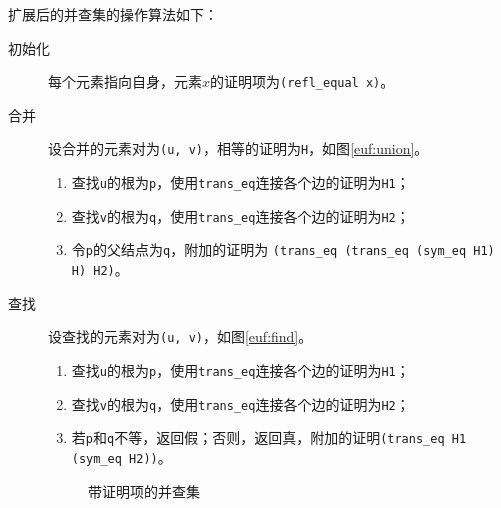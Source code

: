扩展后的并查集的操作算法如下：
\begin{description}
  \item[初始化] 每个元素指向自身，元素$x$的证明项为\texttt{(refl\_equal x)}。
  \item[合并] 设合并的元素对为\texttt{(u, v)}，相等的证明为\texttt{H}，如图\ref{euf:union}。
    \begin{enumerate}
      \item 查找\texttt{u}的根为\texttt{p}，使用\texttt{trans\_eq}连接各个边的证明为\texttt{H1}；
      \item 查找\texttt{v}的根为\texttt{q}，使用\texttt{trans\_eq}连接各个边的证明为\texttt{H2}；
      \item 令\texttt{p}的父结点为\texttt{q}，附加的证明为
        \texttt{(trans\_eq (trans\_eq (sym\_eq H1) H) H2)}。
    \end{enumerate}
  \item[查找] 设查找的元素对为\texttt{(u, v)}，如图\ref{euf:find}。
    \begin{enumerate}
      \item 查找\texttt{u}的根为\texttt{p}，使用\texttt{trans\_eq}连接各个边的证明为\texttt{H1}；
      \item 查找\texttt{v}的根为\texttt{q}，使用\texttt{trans\_eq}连接各个边的证明为\texttt{H2}；
      \item 若\texttt{p}和\texttt{q}不等，返回假；否则，返回真，附加的证明\texttt{(trans\_eq H1 (sym\_eq H2))}。
    \end{enumerate}

\begin{figure}[!h]
\centering
{}
\caption{带证明项的并查集}

\end{figure}
\end{description}


